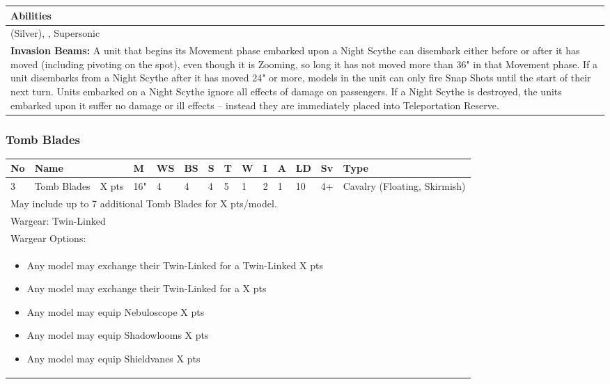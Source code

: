 \noindent
\begin{tabular}{||m{532pt}||}
	\hline
	Abilities \\
	\hline
	\quickref{Awakening Protocols} (Silver), \quickref{Living Metal}, Supersonic\\
	\textbf{Invasion Beams:} A unit that begins its Movement phase embarked upon a Night Scythe can disembark either before or after it has moved (including pivoting on the spot), even though it is Zooming, so long it has not moved more than 36" in that Movement phase. If a unit disembarks from a Night Scythe after it has moved 24" or more, models in the unit can only fire Snap Shots until the start of their next turn. Units embarked on a Night Scythe ignore all effects of damage on passengers. If a Night Scythe is destroyed, the units embarked upon it suffer no damage or ill effects – instead they are immediately placed into Teleportation Reserve. \\
	\hline
\end{tabular}


\newpage
\subsubsection{Tomb Blades}

\noindent
\begin{tabular}{||m{10pt} m{95pt} m{30pt} m{11pt} m{11pt} m{11pt} m{11pt} m{11pt} m{11pt} m{11pt} m{11pt} m{11pt} m{11pt} m{125pt}||}
	\hline
	No & Name & & M & WS & BS & S & T & W & I & A & LD & Sv & Type \\
	\hline
	3 & Tomb Blades & X pts & 16" & 4 & 4 & 4 & 5 & 1 & 2 & 1 & 10 & 4+ & Cavalry (Floating, Skirmish)\\
	\hline
	\hline
	\multicolumn{14}{||Z{532 pt}||}{May include up to 7 additional Tomb Blades for X pts/model.}\\		
	\hline
	\hline
	\multicolumn{14}{||Z{532 pt}||}{Wargear: Twin-Linked \quickref{Gauss Blaster}}\\
	\multicolumn{14}{||Z{532 pt}||}{Wargear Options:} \\	\multicolumn{14}{||Z{532 pt}||}{\begin{itemize}
			\item Any model may exchange their Twin-Linked \quickref{Gauss Blaster} for a Twin-Linked \quickref{Tesla Carbine} \hrulefill X pts
			\item Any model may exchange their Twin-Linked \quickref{Gauss Blaster} for a \quickref{Particle Beamer} \hrulefill X pts
			\item Any model may equip Nebuloscope \hrulefill X pts
			\item Any model may equip Shadowlooms \hrulefill X pts
			\item Any model may equip Shieldvanes \hrulefill X pts
	\end{itemize}} \\
	\hline
\end{tabular}


